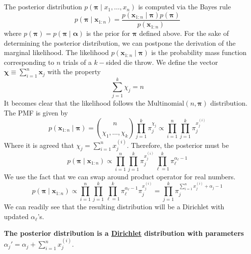 \documentclass{article}
\numberwithin{equation}{section}
\begin{document}
\subsection{}
The posterior distribution $p( \bm{ \pi} \mid x_1 , \dots , x_n) $ is computed via 
the Bayes rule
\[
        p(\bm{ \pi} \mid \mathbf{x}_{1:n}) = 
        \frac{p(\mathbf{x}_{1:n} \mid \bm{ \pi} ) p(\bm{ \pi}) }{p(\mathbf{x}_{1:n})}
\]
where $p(\bm{ \pi} ) = p(\bm{ \pi} \mid \bm{\alpha} )$ is the prior for $\bm{ \pi} $
defined above. For the sake of determining the 
posterior distribution, we can postpone the derivation of the marginal likelihood.
The likelihood $p(\mathbf{x}_{1:n} \mid \bm{ \pi} )$ is the probability mass function 
corresponding to $n$ trials of a $k-$sided die throw. We define the vector 
$\bm{\chi} \equiv \sum_{i=1}^n \mathbf{x}_j$ with the property
\[
        \sum_{j = 1}^k \chi_j = n
\]
It becomes clear that the likelihood follows the 
$ \text{Multinomial}(n, \bm{ \pi})  $ distribution. 
The PMF is given by
\[
        p(\mathbf{x}_{1:n} \mid \bm{ \pi} ) =
\binom{n}{\chi_1,\dots,\chi_k}
        \prod_{j=1}^k \pi_j^{\chi_j}
        \propto 
        \prod_{i = 1}^n
        \prod_{j=1}^k \pi_j^{x_j^{(i)}}
\]
Where it is agreed that $\chi_j = \sum_{i = 1}^n x^{(i)}_j$. 
Therefore, the posterior must be
\[
        p(\bm{ \pi} \mid \mathbf{x}_{1:n} ) \propto 
        \prod_{i = 1}^n \prod_{j=1}^k \pi_j^{x_j^{(i)}}
                \prod_{\ell = 1}^k \pi_\ell^{\alpha_\ell -1}
\] 
We use the fact that we can swap around product operator for real numbers.
\[
         p(\bm{ \pi} \mid \mathbf{x}_{1:n} ) \propto 
        \prod_{i = 1}^n \prod_{j=1}^k 
                      \prod_{\ell = 1}^k \pi_\ell^{\alpha_\ell -1}\pi_j^{x_j^{(i)}}
                      = \prod_{j = 1}^k \pi_j^{\sum_{i = 1}^n x_j^{(i)} + \alpha_j -1}

\]
We can readily see that the resulting distribution will be a Dirichlet with 
updated $\alpha_\ell$'s. 

\textbf{The posterior distribution is a \underline{Dirichlet} distribution with parameters 
$\alpha_j'= \alpha_j + \sum_{i = 1}^n x_j^{(i)} $}.
\end{document}
